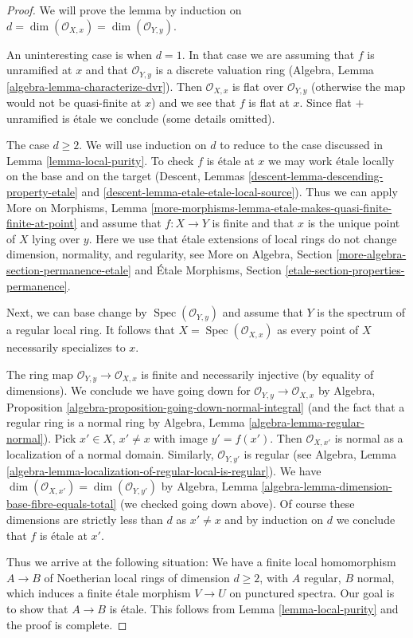 \documentclass[10pt,a4paper]{amsart}
\theoremstyle{plain}
\theoremstyle{definition}
\theoremstyle{remark}
\numberwithin{equation}{subsection}
\def\Spec{\mathop{\mathrm{Spec}}}
\begin{document}
\begin{proof}
We will prove the lemma by induction on
$d = \dim(\mathcal{O}_{X, x}) = \dim(\mathcal{O}_{Y, y})$.

\medskip\noindent
An uninteresting case is when $d = 1$.
In that case we are assuming that $f$ is unramified at $x$
and that $\mathcal{O}_{Y, y}$ is a discrete valuation ring
(Algebra, Lemma \ref{algebra-lemma-characterize-dvr}).
Then $\mathcal{O}_{X, x}$ is flat over $\mathcal{O}_{Y, y}$
(otherwise the map would not be quasi-finite at $x$)
and we see that $f$ is flat at $x$. Since flat $+$
unramified is \'etale we conclude (some details omitted).

\medskip\noindent
The case $d \geq 2$. We will use induction on $d$ to reduce
to the case discussed in Lemma \ref{lemma-local-purity}.
To check $f$ is \'etale at $x$ we may work \'etale locally
on the base and on the target
(Descent, Lemmas \ref{descent-lemma-descending-property-etale} and
\ref{descent-lemma-etale-etale-local-source}).
Thus we can apply More on Morphisms, Lemma
\ref{more-morphisms-lemma-etale-makes-quasi-finite-finite-at-point}
and assume that $f : X \to Y$ is finite and that $x$ is the unique
point of $X$ lying over $y$. Here we use that \'etale extensions of
local rings do not change dimension, normality, and regularity, see
More on Algebra, Section \ref{more-algebra-section-permanence-etale}
and
\'Etale Morphisms, Section \ref{etale-section-properties-permanence}.

\medskip\noindent
Next, we can base change by $\Spec(\mathcal{O}_{Y, y})$
and assume that $Y$ is the spectrum of a regular local ring.
It follows that $X = \Spec(\mathcal{O}_{X, x})$ as
every point of $X$ necessarily specializes to $x$.

\medskip\noindent
The ring map $\mathcal{O}_{Y, y} \to \mathcal{O}_{X, x}$ is
finite and necessarily injective (by equality of dimensions).
We conclude we have going down for
$\mathcal{O}_{Y, y} \to \mathcal{O}_{X, x}$ by
Algebra, Proposition \ref{algebra-proposition-going-down-normal-integral}
(and the fact that a regular ring is a normal ring by
Algebra, Lemma \ref{algebra-lemma-regular-normal}).
Pick $x' \in X$, $x' \not = x$ with image $y' = f(x')$.
Then $\mathcal{O}_{X, x'}$ is normal as a localization
of a normal domain. Similarly, $\mathcal{O}_{Y, y'}$ is
regular (see Algebra, Lemma
\ref{algebra-lemma-localization-of-regular-local-is-regular}).
We have $\dim(\mathcal{O}_{X, x'}) = \dim(\mathcal{O}_{Y, y'})$ by
Algebra, Lemma \ref{algebra-lemma-dimension-base-fibre-equals-total}
(we checked going down above).
Of course these dimensions are strictly less than $d$ as $x' \not = x$
and by induction on $d$ we conclude that $f$ is \'etale at $x'$.

\medskip\noindent
Thus we arrive at the following situation: We have a finite
local homomorphism $A \to B$ of Noetherian local rings
of dimension $d \geq 2$, with $A$ regular, $B$ normal, which
induces a finite \'etale morphism $V \to U$ on punctured spectra.
Our goal is to show that $A \to B$ is \'etale.
This follows from Lemma \ref{lemma-local-purity}
and the proof is complete.
\end{proof}
\end{document}
